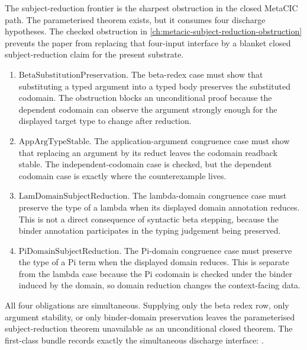 The subject-reduction frontier is the sharpest obstruction in the closed
MetaCIC path. The parameterised theorem exists, but it consumes four discharge
hypotheses. The checked obstruction in
\autoref{ch:metacic-subject-reduction-obstruction} prevents the paper from
replacing that four-input interface by a blanket closed subject-reduction
claim for the present substrate.

\begin{enumerate}
\item $\mathrm{BetaSubstitutionPreservation}$. The beta-redex case must show
  that substituting a typed argument into a typed body preserves the substituted
  codomain. The obstruction blocks an unconditional proof because the dependent
  codomain can observe the argument strongly enough for the displayed target
  type to change after reduction.
\item $\mathrm{AppArgTypeStable}$. The application-argument congruence case
  must show that replacing an argument by its reduct leaves the codomain
  readback stable. The independent-codomain case is checked, but the dependent
  codomain case is exactly where the counterexample lives.
\item $\mathrm{LamDomainSubjectReduction}$. The lambda-domain congruence case
  must preserve the type of a lambda when its displayed domain annotation
  reduces. This is not a direct consequence of syntactic beta stepping, because
  the binder annotation participates in the typing judgement being preserved.
\item $\mathrm{PiDomainSubjectReduction}$. The Pi-domain congruence case must
  preserve the type of a Pi term when the displayed domain reduces. This is
  separate from the lambda case because the Pi codomain is checked under the
  binder induced by the domain, so domain reduction changes the context-facing
  data.
\end{enumerate}

All four obligations are simultaneous. Supplying only the beta redex row, only
argument stability, or only binder-domain preservation leaves the parameterised
subject-reduction theorem unavailable as an unconditional closed theorem. The
first-class bundle records exactly the simultaneous discharge interface:
.

